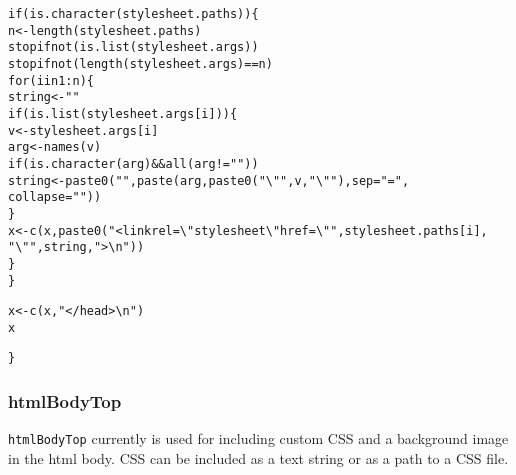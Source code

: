 \documentclass{article}\usepackage[]{graphicx}\usepackage[]{color}
\makeatletter
\newcommand{\hlnum}[1]{\textcolor[rgb]{0.863,0.196,0.184}{#1}}%
\newcommand{\hlstr}[1]{\textcolor[rgb]{0.863,0.196,0.184}{#1}}%
\newcommand{\hlopt}[1]{\textcolor[rgb]{0.576,0.631,0.631}{#1}}%
\newcommand{\hlstd}[1]{\textcolor[rgb]{0.514,0.58,0.588}{#1}}%
\newcommand{\hlkwa}[1]{\textcolor[rgb]{0.796,0.294,0.086}{#1}}%
\newcommand{\hlkwb}[1]{\textcolor[rgb]{0.522,0.6,0}{#1}}%
\newcommand{\hlkwc}[1]{\textcolor[rgb]{0.796,0.294,0.086}{#1}}%
\newcommand{\hlkwd}[1]{\textcolor[rgb]{0.576,0.631,0.631}{#1}}%
\newenvironment{kframe}{%
 \def\at@end@of@kframe{}%
 \ifinner\ifhmode%
  \def\at@end@of@kframe{\end{minipage}}%
  \begin{minipage}{\columnwidth}%
 \fi\fi%
 \def\FrameCommand##1{\hskip\@totalleftmargin \hskip-\fboxsep
 \colorbox{shadecolor}{##1}\hskip-\fboxsep
     \hskip-\linewidth \hskip-\@totalleftmargin \hskip\columnwidth}%
 \MakeFramed {\advance\hsize-\width
   \@totalleftmargin\z@ \linewidth\hsize
   \@setminipage}}%
 {\par\unskip\endMakeFramed%
 \at@end@of@kframe}
\newenvironment{knitrout}{}{} %
\makeatother
\begin{document}
\begin{knitrout}
\begin{kframe}
\begin{alltt}
    \hlkwa{if} \hlstd{(}\hlkwd{is.character}\hlstd{(stylesheet.paths)) \{}
        \hlstd{n} \hlkwb{<-} \hlkwd{length}\hlstd{(stylesheet.paths)}
        \hlkwd{stopifnot}\hlstd{(}\hlkwd{is.list}\hlstd{(stylesheet.args))}
        \hlkwd{stopifnot}\hlstd{(}\hlkwd{length}\hlstd{(stylesheet.args)} \hlopt{==} \hlstd{n)}
        \hlkwa{for} \hlstd{(i} \hlkwa{in} \hlnum{1}\hlopt{:}\hlstd{n) \{}
            \hlstd{string} \hlkwb{<-} \hlstr{""}
            \hlkwa{if} \hlstd{(}\hlkwd{is.list}\hlstd{(stylesheet.args[i])) \{}
                \hlstd{v} \hlkwb{<-} \hlstd{stylesheet.args[i]}
                \hlstd{arg} \hlkwb{<-} \hlkwd{names}\hlstd{(v)}
                \hlkwa{if} \hlstd{(}\hlkwd{is.character}\hlstd{(arg)} \hlopt{&&} \hlkwd{all}\hlstd{(arg} \hlopt{!=} \hlstr{""}\hlstd{))}
                  \hlstd{string} \hlkwb{<-} \hlkwd{paste0}\hlstd{(}\hlstr{" "}\hlstd{,} \hlkwd{paste}\hlstd{(arg,} \hlkwd{paste0}\hlstd{(}\hlstr{"\textbackslash{}""}\hlstd{, v,} \hlstr{"\textbackslash{}""}\hlstd{),} \hlkwc{sep} \hlstd{=} \hlstr{"="}\hlstd{,}
                    \hlkwc{collapse} \hlstd{=} \hlstr{" "}\hlstd{))}
            \hlstd{\}}
            \hlstd{x} \hlkwb{<-} \hlkwd{c}\hlstd{(x,} \hlkwd{paste0}\hlstd{(}\hlstr{"<link rel=\textbackslash{}"stylesheet\textbackslash{}" href=\textbackslash{}""}\hlstd{, stylesheet.paths[i],}
                \hlstr{"\textbackslash{}""}\hlstd{, string,} \hlstr{">\textbackslash{}n"}\hlstd{))}
        \hlstd{\}}
    \hlstd{\}}

    \hlstd{x} \hlkwb{<-} \hlkwd{c}\hlstd{(x,} \hlstr{"</head>\textbackslash{}n"}\hlstd{)}
    \hlstd{x}

\hlstd{\}}
\end{alltt}
\end{kframe}
\end{knitrout}

\subsubsection{htmlBodyTop}

\texttt{htmlBodyTop} currently is used for including custom CSS and a background image in the html body.
CSS can be included as a text string or as a path to a CSS file.
\end{document}
